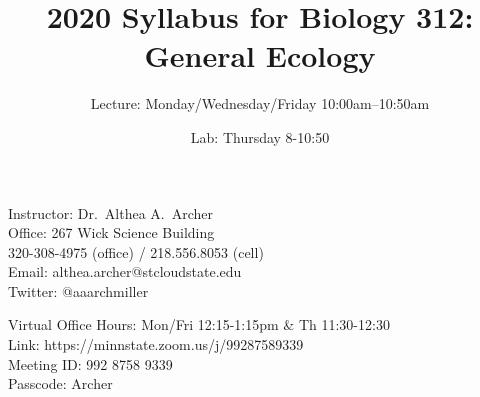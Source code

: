 \documentclass{tufte-handout}
\title{2020 Syllabus for Biology 312: General Ecology}										%
\author{Lecture: Monday/Wednesday/Friday 10:00am--10:50am}										%
\date{Lab: Thursday 8-10:50}
\begin{document}
\maketitle

Instructor: Dr.~Althea A.~Archer\\
Office: 267 Wick Science Building\\
320-308-4975 (office) / 218.556.8053 (cell)\\
Email: althea.archer@stcloudstate.edu\\
Twitter: @aaarchmiller

Virtual Office Hours: Mon/Fri 12:15-1:15pm \& Th 11:30-12:30\\
Link: https://minnstate.zoom.us/j/99287589339\\
Meeting ID: 992 8758 9339\\
Passcode: Archer
\end{document}
